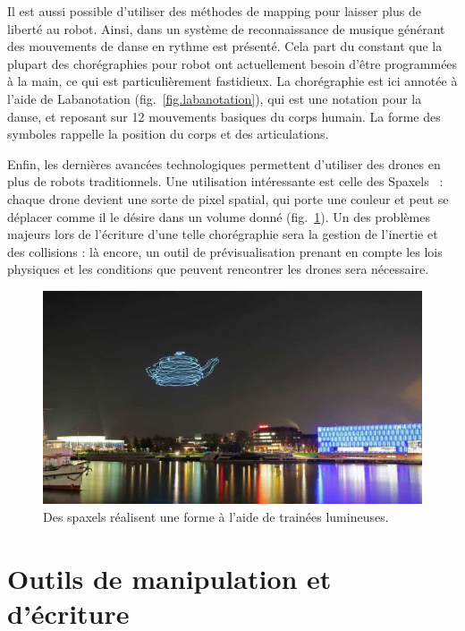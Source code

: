 \documentclass[french,12pt]{article}
\begin{document}
Il est aussi possible d'utiliser des méthodes de mapping pour laisser plus de liberté au robot. Ainsi, dans \cite{seo_autonomous_2013} un système de reconnaissance de musique générant des mouvements de danse en rythme est présenté. Cela part du constant que la plupart des chorégraphies pour robot ont actuellement besoin d'être programmées à la main, ce qui est particulièrement fastidieux. La chorégraphie est ici annotée à l'aide de Labanotation (fig.~\ref{fig.labanotation}), qui est une notation pour la danse, et reposant sur 12 mouvements basiques du corps humain. La forme des symboles rappelle la position du corps et des articulations.

Enfin, les dernières avancées technologiques permettent d'utiliser des drones en plus de robots traditionnels. Une utilisation intéressante est celle des Spaxels~\cite{hortner_spaxels_2012} : chaque drone devient une sorte de pixel spatial, qui porte une couleur et peut se déplacer comme il le désire dans un volume donné (fig.~\ref{fig.spaxels}).   
Un des problèmes majeurs lors de l'écriture d'une telle chorégraphie sera la gestion de l'inertie et des collisions : là encore, un outil de prévisualisation prenant en compte les lois physiques et les conditions que peuvent rencontrer les drones sera nécessaire.

\begin{figure}[h]
    \centering
    \includegraphics[scale=0.25]{images/spaxels.jpg}
    \caption{Des spaxels réalisent une forme à l'aide de trainées lumineuses.}
    \label{fig.spaxels}
\end{figure}

\newpage
\section{Outils de manipulation et d'écriture}
\end{document}
